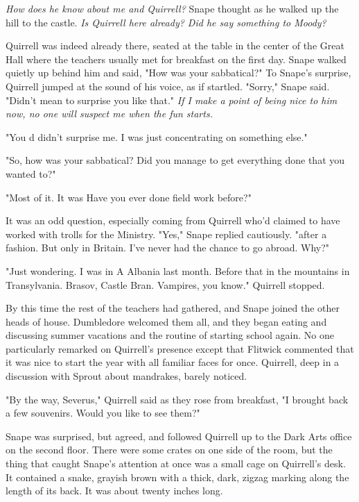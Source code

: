 \emph{How does he know about me and Quirrell?} Snape thought as he walked up the hill to the castle. \emph{Is Quirrell here already? Did he say something to Moody?}

Quirrell was indeed already there, seated at the table in the center of the Great Hall where the teachers usually met for breakfast on the first day. Snape walked quietly up behind him and said, "How was your sabbatical?" To Snape's surprise, Quirrell jumped at the sound of his voice, as if startled. "Sorry," Snape said. "Didn't mean to surprise you like that." \emph{If I make a point of being nice to him now, no one will suspect me when the fun starts.}

"You d{\el} didn't surprise me. I was just concentrating on something else."

"So, how was your sabbatical? Did you manage to get everything done that you wanted to?"

"Most of it. It was{\el} Have you ever done field work before?"

It was an odd question, especially coming from Quirrell who'd claimed to have worked with trolls for the Ministry. "Yes," Snape replied cautiously. "after a fashion. But only in Britain. I've never had the chance to go abroad. Why?"

"Just wondering. I was in A{\el} Albania last month. Before that in the mountains in Transylvania. Brasov, Castle Bran. V{\el}ampires, you know." Quirrell stopped.

By this time the rest of the teachers had gathered, and Snape joined the other heads of house. Dumbledore welcomed them all, and they began eating and discussing summer vacations and the routine of starting school again. No one particularly remarked on Quirrell's presence except that Flitwick commented that it was nice to start the year with all familiar faces for once. Quirrell, deep in a discussion with Sprout about mandrakes, barely noticed.

"By the way, Severus," Quirrell said as they rose from breakfast, "I brought back a few souvenirs. Would you like to see them?"

Snape was surprised, but agreed, and followed Quirrell up to the Dark Arts office on the second floor. There were some crates on one side of the room, but the thing that caught Snape's attention at once was a small cage on Quirrell's desk. It contained a snake, grayish brown with a thick, dark, zigzag marking along the length of its back. It was about twenty inches long.

